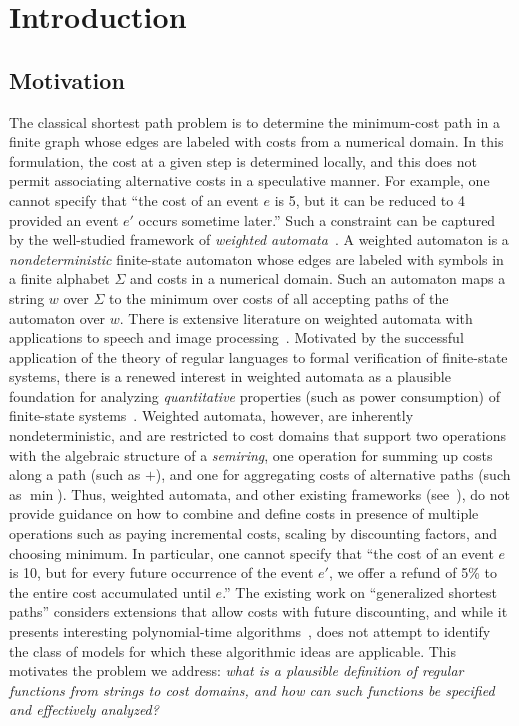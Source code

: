 \documentclass[11pt]{article}
\newcommand{\mypar}[1]{\subsection{#1}}
\begin{document}
\section{Introduction}
\mypar{Motivation}
The classical shortest path problem is to determine the minimum-cost
path in a finite graph whose edges are labeled with costs from a
numerical domain.  In this formulation, the cost at a given step is
determined locally, and this does not permit associating alternative
costs in a speculative manner. For example, one cannot specify that
``the cost of an event $e$ is 5, but it can be reduced to 4 provided
an event $e'$ occurs sometime later.'' Such a constraint can be
captured by the well-studied framework of {\em weighted
automata\/}~\cite{Sch61,droste_handbook_2009}.  A weighted automaton
is a {\em nondeterministic\/} finite-state automaton whose edges are
labeled with symbols in a finite alphabet $\Sigma$ and costs in a
numerical domain. Such an automaton maps a string $w$ over $\Sigma$ to
the minimum over costs of all accepting paths of the automaton over
$w$.  There is extensive literature on weighted automata with
applications to speech and image processing~\cite{MPR02}.  Motivated
by the successful application of the theory of regular languages to
formal verification of finite-state systems, there is a renewed
interest in weighted automata as a plausible foundation for analyzing
{\em quantitative\/} properties (such as power consumption) of
finite-state systems~\cite{CDH10,AKL10,almagor_what_2011}.  Weighted
automata, however, are inherently nondeterministic, and are restricted
to cost domains that support two operations with the algebraic
structure of a {\em semiring}, one operation for summing up costs
along a path (such as $+$), and one for aggregating costs of
alternative paths (such as $\min$).  Thus, weighted automata, and
other existing frameworks
(see~\cite{colcombet_regular_2010,neven_finite_2004}), do not provide
guidance on how to combine and define costs in presence of multiple
operations such as paying incremental costs, scaling by discounting
factors, and choosing minimum.  In particular, one cannot specify that
``the cost of an event $e$ is 10, but for every future occurrence of
the event $e'$, we offer a refund of 5\% to the entire cost
accumulated until $e$.'' The existing work on ``generalized shortest
paths'' considers extensions that allow costs with future discounting,
and while it presents interesting polynomial-time
algorithms~\cite{goldberg_combinatorial_1988,
oldham_combinatorial_1999}, does not attempt to identify the class of
models for which these algorithmic ideas are applicable.  This
motivates the problem we address: {\em what is a plausible definition
of regular functions from strings to cost domains, and how can such
functions be specified and effectively analyzed?\/}
\end{document}
